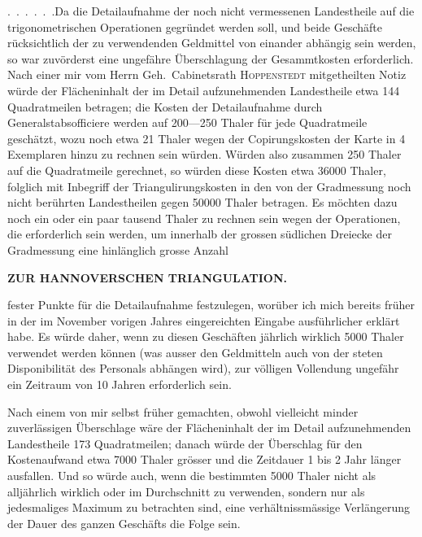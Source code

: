 \par\noindent\hspace*{\parindent}\mbox{.\ .\ .\ .\ .\ .}\quad Da die Detailaufnahme der noch nicht vermessenen Landestheile
auf die trigonometrischen Operationen gegründet werden soll, und beide Geschäfte
rücksichtlich der zu verwendenden Geldmittel von einander abhängig
sein werden, so war zuvörderst eine ungefähre Überschlagung der Gesammtkosten
erforderlich. Nach einer mir vom Herrn Geh.~Cabinetsrath \textsc{Hoppenstedt}
mitgetheilten Notiz würde der Flächeninhalt der im Detail aufzunehmenden
Landestheile etwa 144 Quadratmeilen betragen; die Kosten der
Detailaufnahme durch Generalstabsofficiere werden auf 200---250 Thaler für
jede Quadratmeile geschätzt, wozu noch etwa 21 Thaler wegen der Copirungskosten
der Karte in 4 Exemplaren hinzu zu rechnen sein würden. Würden also
zusammen 250 Thaler auf die Quadratmeile gerechnet, so würden diese Kosten
etwa 36000 Thaler, folglich mit Inbegriff der Triangulirungskosten in den
von der Gradmessung noch nicht berührten Landestheilen gegen 50000 Thaler
betragen. Es möchten dazu noch ein oder ein paar tausend Thaler zu rechnen
sein wegen der Operationen, die erforderlich sein werden, um innerhalb der
grossen südlichen Dreiecke der Gradmessung eine hinlänglich grosse Anzahl
\par
\clearpage
\noindent\null\hfill{\small\textbf{ZUR HANNOVERSCHEN TRIANGULATION.}}\hfill{}\par\medskip
\noindent fester Punkte für die Detailaufnahme festzulegen, worüber ich mich bereits
früher in der im November vorigen Jahres eingereichten Eingabe ausführlicher
erklärt habe. Es würde daher, wenn zu diesen Geschäften jährlich wirklich
5000 Thaler verwendet werden können (was ausser den Geldmitteln auch
von der steten Disponibilität des Personals abhängen wird), zur völligen Vollendung
ungefähr ein Zeitraum von 10 Jahren erforderlich sein.

Nach einem von mir selbst früher gemachten, obwohl vielleicht minder
zuverlässigen Überschlage wäre der Flächeninhalt der im Detail aufzunehmenden
Landestheile 173 Quadratmeilen; danach würde der Überschlag für den
Kostenaufwand etwa 7000 Thaler grösser und die Zeitdauer 1 bis 2 Jahr
länger ausfallen. Und so würde auch, wenn die bestimmten 5000 Thaler
nicht als alljährlich wirklich oder im Durchschnitt zu verwenden, sondern nur
als jedesmaliges Maximum zu betrachten sind, eine verhältnissmässige Verlängerung
der Dauer des ganzen Geschäfts die Folge sein.

